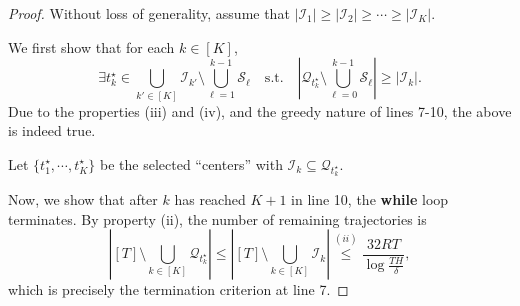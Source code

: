 \documentclass[10pt,a4paper]{amsart}
\def\bigabs#1{\left| #1 \right|}
\def\gI{{\mathcal{I}}}
\def\gQ{{\mathcal{Q}}}
\def\gS{{\mathcal{S}}}
\begin{document}
\begin{proof}
    Without loss of generality, assume that $|\gI_1| \geq |\gI_2| \geq \cdots \geq |\gI_K|$.
    
    We first show that for each $k \in [K]$,
    \begin{equation*}
        \exists t_k^\star \in \bigcup_{k' \in [K]} \gI_{k'} \setminus \bigcup_{\ell=1}^{k-1} \gS_\ell \quad \text{s.t.} \quad \bigabs{\gQ_{t_k^\star} \setminus \bigcup_{\ell=0}^{k-1} \gS_\ell} \geq |\gI_k|.
    \end{equation*}
    Due to the properties (iii) and (iv), and the greedy nature of lines 7-10, the above is indeed true.
    
    Let $\{t_1^\star, \cdots, t_K^\star\}$ be the selected ``centers'' with $\gI_k \subseteq \gQ_{t_k^\star}$.

    Now, we show that after $k$ has reached $K + 1$ in line 10, the \textbf{while} loop terminates.
    By property (ii), the number of remaining trajectories is
    \begin{equation*}
        \bigabs{[T] \setminus \bigcup_{k \in [K]} \gQ_{t_k^\star}}
        \leq \bigabs{[T] \setminus \bigcup_{k \in [K]} \gI_k}
        \overset{(ii)}{\leq} \frac{32 R T}{\log\frac{TH}{\delta}},
    \end{equation*}
    which is precisely the termination criterion at line 7.
\end{proof}
\end{document}
